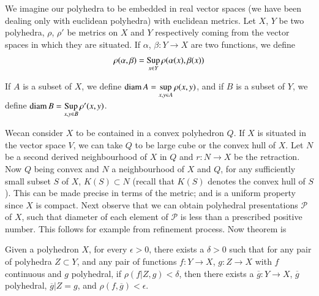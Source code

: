 We imagine our polyhedra to be embedded in real vector spaces (we have been dealing only with euclidean polyhedra) with euclidean metrics. Let $X$, $Y$ be two polyhedra, $\rho$, $\rho'$ be metrics on $X$ and $Y$ respectively coming from the vector spaces in which they are situated. If $\alpha$, $\beta:Y\to X$ are two functions, we define
$$
\rho(\alpha,\beta)={\displaystyle\mathop{\operatorname{Sup}}_{x\in Y}}\,\rho(\alpha(x),\beta(x))
$$

If $A$ is a subset of $X$, we define $\operatorname{diam} A=\sup\limits_{x,y\in A}\rho(x,y)$,
and if $B$ is a subset of $Y$, we define $\operatorname{diam} B={\displaystyle\mathop{\operatorname{Sup}}_{x,y\in B}}\,\rho'(x,y)$. 


We\pageoriginale can consider $X$ to be contained in a convex polyhedron $Q$. If $X$ is situated in the vector space $V$, we can take $Q$ to be large cube or the convex hull of $X$. Let $N$ be a second derived neighbourhood of $X$ in $Q$ and $r:N\to X$ be the retraction. Now $Q$ being convex and $N$ a neighbourhood of $X$ and $Q$, for any sufficiently small subset $S$ of $X$, $K(S)\subset N$ (recall that $K(S)$ denotes the convex hull of $S$). This can be made precise in terms of the metric; and is a uniform property since $X$ is compact. Next observe that we can obtain polyhedral presentations $\mathscr{P}$ of $X$, such that diameter of each element of $\mathscr{P}$ is less than a prescribed positive number. This follows for example from refinement process. Now theorem
is 

\begin{theorem}\label{chap3-thm3.2.1}
Given a polyhedron $X$, for every $\epsilon>0$, there exists a $\delta>0$ such that for any pair of polyhedra $Z\subset Y$, and any pair of functions $f:Y\to X$, $g:Z\to X$ with $f$ continuous and $g$ polyhedral, if $\rho(f|Z,g)<\delta$, then there exists a $\overline{g}:Y\to X$, $\overline{g}$ polyhedral, $\overline{g}|Z=g$, and $\rho(f,\overline{g})<\epsilon$.
\end{theorem}


